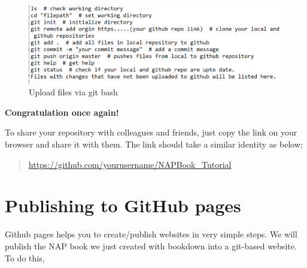 \documentclass[
]{book}
\begin{document}
\begin{figure}
\centering
\includegraphics{tutorial_screenshots/gh_bash_upload.png}
\caption{Upload files via git bash}
\end{figure}

\textbf{Congratulation once again!}

To share your repository with colleagues and friends, just copy the link on your browser and share it with them. The link should take a similar identity as below;

\begin{quote}
\url{https://github.com/yourusername/NAPBook_Tutorial}
\end{quote}

\hypertarget{publishing-to-github-pages}{%
\section{Publishing to GitHub pages}\label{publishing-to-github-pages}}

Github pages helps you to create/publish websites in very simple steps.
We will publish the NAP book we just created with bookdown into a git-based website.
To do this,
\end{document}
